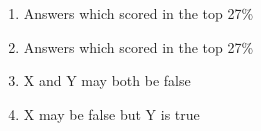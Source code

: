\documentclass[11pt]{article}
\begin{document}
\begin{enumerate}
    \item Answers which scored in the top 27\%
    \item Answers which scored in the top 27\%
    \item X and Y may both be false
    \item X may be false but Y is true
\end{enumerate}
\end{document}

